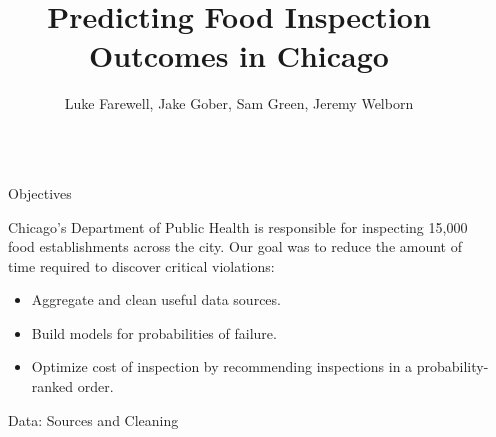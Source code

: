 \documentclass[final]{beamer}
\title{Predicting Food Inspection Outcomes in Chicago} %
\author{Luke Farewell, Jake Gober, Sam Green, Jeremy Welborn} %
\institute{Computer Science 109a / Statistics 121a, Harvard University} %
\newlength{\sepwid}
\newlength{\onecolwid}
\begin{document}

\setlength{\belowcaptionskip}{2ex} %
\setlength\belowdisplayshortskip{2ex} %

\begin{frame}[t] %

\begin{columns}[t] %

\begin{column}{\sepwid}\end{column} %

\begin{column}{\onecolwid} %


\begin{alertblock}{Objectives}

Chicago's Department of Public Health is responsible for 
inspecting 15,000 food establishments across the city. 
Our goal was to reduce the amount of time required to 
discover critical violations: 

\begin{itemize}
\item Aggregate and clean useful data sources.
\item Build models for probabilities of failure.
\item Optimize cost of inspection by recommending inspections
in a probability-ranked order.
\end{itemize}

\end{alertblock}


\begin{block}{Data: Sources and Cleaning}


\end{block}
\end{column}
\end{columns}
\end{frame}
\end{document}
